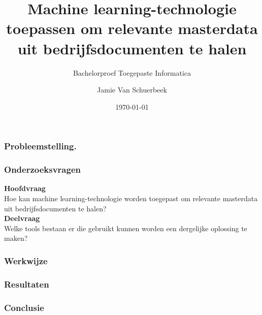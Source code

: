 \documentclass[aspectratio=169]{beamer}
\title{Machine learning-technologie toepassen om relevante masterdata uit bedrijfsdocumenten te halen}
\subtitle{Bachelorproef Toegepaste Informatica}
\author{Jamie Van Schuerbeek}
\date{\today}
\begin{document}

\frame{\maketitle}
 

\begin{frame}
  \frametitle{Probleemstelling.}
  
  
\end{frame}

\begin{frame}
  \frametitle{Onderzoeksvragen}
  \centering
  \textbf{Hoofdvraag}
\\
Hoe kan machine learning-technologie worden toegepast om relevante masterdata uit bedrijfsdocumenten te halen?
\\
\textbf{Deelvraag}
\\
Welke tools bestaan er die gebruikt kunnen worden een dergelijke oplossing te maken?
\end{frame}

\begin{frame}
  \frametitle{Werkwijze}

\end{frame}

\begin{frame}
  \frametitle{Resultaten}

\end{frame}

\begin{frame}
  \frametitle{Conclusie}

\end{frame}
\end{document}
